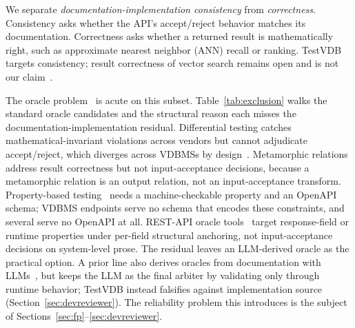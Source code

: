\documentclass[sigconf]{acmart}
\begin{document}
We separate \emph{documentation-implementation consistency} from \emph{correctness}. Consistency asks whether the API's accept/reject behavior matches its documentation. Correctness asks whether a returned result is mathematically right, such as approximate nearest neighbor (ANN) recall or ranking. TestVDB targets consistency; result correctness of vector search remains open and is not our claim~\cite{roadmap25}.

The oracle problem~\cite{barr15} is acute on this subset. Table~\ref{tab:exclusion} walks the standard oracle candidates and the structural reason each misses the documentation-implementation residual. Differential testing catches mathematical-invariant violations across vendors but cannot adjudicate accept/reject, which diverges across VDBMSs by design~\cite{roadmap25}. Metamorphic relations~\cite{metmap24} address result correctness but not input-acceptance decisions, because a metamorphic relation is an output relation, not an input-acceptance transform. Property-based testing~\cite{claessen00} needs a machine-checkable property and an OpenAPI schema; VDBMS endpoints serve no schema that encodes these constraints, and several serve no OpenAPI at all. REST-API oracle tools~\cite{agoraplus25,satori25,mastor26} target response-field or runtime properties under per-field structural anchoring, not input-acceptance decisions on system-level prose. The residual leaves an LLM-derived oracle as the practical option. A prior line also derives oracles from documentation with LLMs~\cite{toradocu16,augmentest25}, but keeps the LLM as the final arbiter by validating only through runtime behavior; TestVDB instead falsifies against implementation source (Section~\ref{sec:devreviewer}). The reliability problem this introduces is the subject of Sections~\ref{sec:fp}--\ref{sec:devreviewer}.
\end{document}
